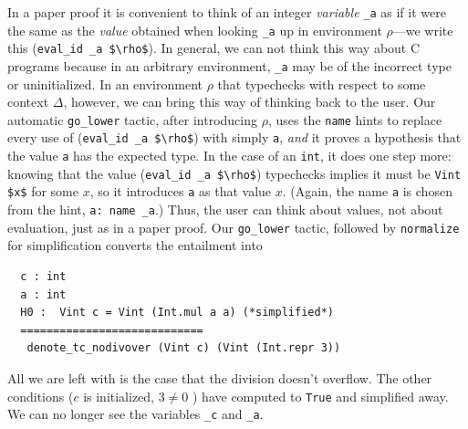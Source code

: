 \documentclass{puthesis}
\begin{document}
In a paper proof it is convenient to think of an 
integer \emph{variable} \lstinline{_a}
as if it were the same as the \emph{value} obtained when looking 
\lstinline{_a} up in
environment $\rho$---we write this (\lstinline|eval_id _a $\rho$|). In general,
we can not think this way about C programs because in an arbitrary environment,
\lstinline|_a| may be of the incorrect type or uninitialized. In an environment
$\rho$ that typechecks with respect to some context $\Delta$, however, we can bring this
way of thinking back to the user. 
Our automatic \lstinline|go_lower| tactic, after introducing $\rho$,
uses the \lstinline{name} hints to replace every use
of (\lstinline|eval_id _a $\rho$|) with simply \lstinline{a},
\emph{and} it proves a hypothesis that the value
\lstinline|a| has the expected type.  In the case of an \lstinline{int},
it does one step more: knowing that  the value 
(\lstinline|eval_id _a $\rho$|) typechecks implies it must 
be \lstinline|Vint $x$| for some $x$, so it introduces \lstinline|a|
as that value $x$.  (Again, the name \lstinline|a| is chosen from
the hint, \lstinline|a: name _a|.)
Thus, the user can think about values, not about evaluation, just
as in a paper proof.
Our \lstinline|go_lower| tactic, followed by \lstinline|normalize| for
simplification converts the entailment into

\begin{lstlisting}
  c : int
  a : int
  H0 :  Vint c = Vint (Int.mul a a) (*simplified*)
  ============================
   denote_tc_nodivover (Vint c) (Vint (Int.repr 3))
\end{lstlisting}
All we are
left with is the case that the division doesn't overflow. 
The other conditions ($c$ is initialized, $3\neq 0$ ) have 
computed to \lstinline|True| and simplified away. 
We can no longer see the variables \lstinline|_c| and \lstinline|_a|.

\end{document}
